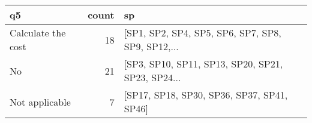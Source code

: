 \begin{tabular}{lrl}
\toprule
                 q5 &  count &                                                 sp \\
\midrule
 Calculate the cost &     18 &  [SP1, SP2, SP4, SP5, SP6, SP7, SP8, SP9, SP12,... \\
                 No &     21 &  [SP3, SP10, SP11, SP13, SP20, SP21, SP23, SP24... \\
     Not applicable &      7 &         [SP17, SP18, SP30, SP36, SP37, SP41, SP46] \\
\bottomrule
\end{tabular}
